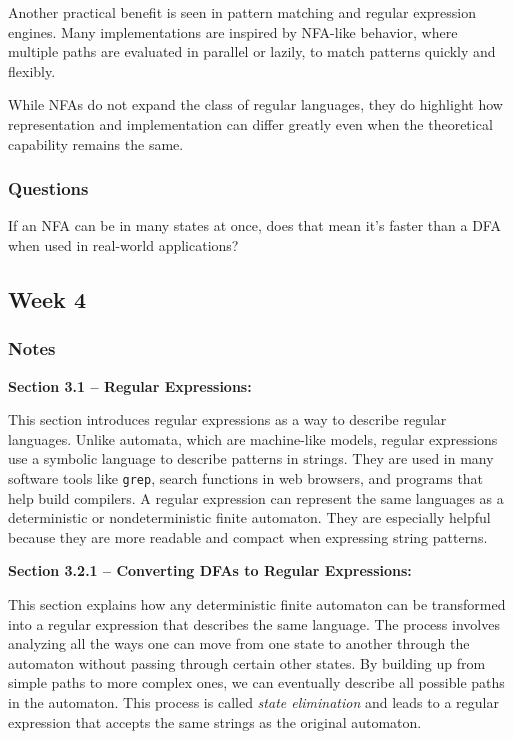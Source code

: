 \documentclass{article}
\theoremstyle{theorem}
\theoremstyle{definition}
\theoremstyle{remark}
\begin{document}
Another practical benefit is seen in pattern matching and regular expression engines. Many implementations are inspired by NFA-like behavior, where multiple paths are evaluated in parallel or lazily, to match patterns quickly and flexibly.

While NFAs do not expand the class of regular languages, they do highlight how representation and implementation can differ greatly even when the theoretical capability remains the same.


\subsubsection{Questions}

If an NFA can be in many states at once, does that mean it's faster than a DFA when used in real-world applications?

\subsection{Week 4}

\subsubsection{Notes}

\textbf{Section 3.1 – Regular Expressions:}

This section introduces regular expressions as a way to describe regular languages. Unlike automata, which are machine-like models, regular expressions use a symbolic language to describe patterns in strings. They are used in many software tools like \texttt{grep}, search functions in web browsers, and programs that help build compilers. A regular expression can represent the same languages as a deterministic or nondeterministic finite automaton. They are especially helpful because they are more readable and compact when expressing string patterns.

\textbf{Section 3.2.1 – Converting DFAs to Regular Expressions:}

This section explains how any deterministic finite automaton can be transformed into a regular expression that describes the same language. The process involves analyzing all the ways one can move from one state to another through the automaton without passing through certain other states. By building up from simple paths to more complex ones, we can eventually describe all possible paths in the automaton. This process is called \textit{state elimination} and leads to a regular expression that accepts the same strings as the original automaton.
\end{document}
